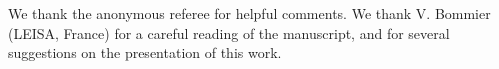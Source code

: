 \documentclass[preprint]{aastex}
\newcommand{\<}{{\kern-5pt}}
\newcommand{\thrj}[6]{\biggl(
	\begin{matrix}
	#1&#2&#3\\
	#4&#5&#6\\
	\end{matrix}\biggr)}
\begin{document}
\begin{acknowledgments}
We thank the anonymous referee for helpful comments. We thank 
V. Bommier (LEISA, France) for a careful reading of the manuscript, and
for several suggestions on the presentation of this work.

\end{acknowledgments}
%
\end{document}
